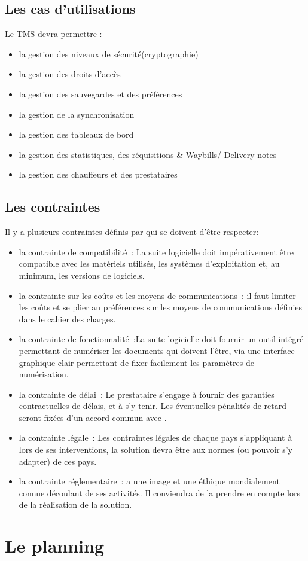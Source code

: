 \subsection{Les cas d'utilisations}
Le TMS devra permettre :
\begin{itemize}
\item la gestion des niveaux de sécurité(cryptographie)
\item la gestion des droits d'accès
\item la gestion des sauvegardes et des préférences 
\item la gestion de la synchronisation
\item la gestion des tableaux de bord
\item la gestion des statistiques, des réquisitions & Waybills/ Delivery notes
\item la gestion des chauffeurs et des prestataires
\end{itemize}

\subsection{Les contraintes}
Il y a plusieurs contraintes définis par \mo qui se doivent d'être respecter:
\begin{itemize}
\item la contrainte de compatibilité~: La suite logicielle doit impérativement être compatible avec les matériels utilisés, les systèmes d'exploitation et, au minimum, les versions de logiciels.

\item la contrainte sur les coûts et les moyens de communications~: il faut limiter les coûts et se plier au préférences sur les moyens de communications définies dans le cahier des charges.

\item la contrainte de fonctionnalité~:La suite logicielle doit fournir un outil intégré permettant de numériser les documents qui doivent l'être, via une interface graphique clair permettant de fixer facilement les paramètres de numérisation.

\item la contrainte de délai~: Le prestataire s'engage à fournir des garanties contractuelles de délais, et à s'y tenir. Les éventuelles pénalités de retard seront fixées d'un accord commun avec \mo.

\item la contrainte légale~: Les contraintes légales de chaque pays s'appliquant à \mo lors de ses interventions, la solution devra être aux normes (ou pouvoir s'y adapter) de ces pays.

\item la contrainte réglementaire~: \mo a une image et une éthique mondialement connue découlant de ses activités. Il conviendra de la prendre en compte lors de la réalisation de la solution.

\end{itemize}

\section{Le planning }
